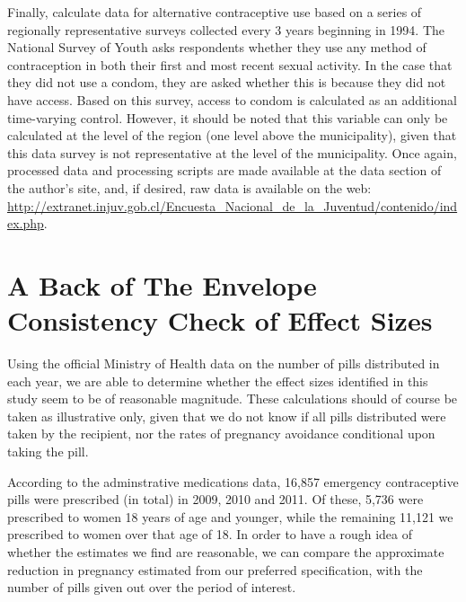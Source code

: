 Finally, \person calculate data for alternative contraceptive use based on
a series of regionally representative surveys collected every 3 years beginning
in 1994.  The National Survey of Youth asks respondents whether they use any 
method of contraception in both their first and most recent sexual activity.  
In the case that they did not use a condom, they are asked whether this is 
because they did not have access.  Based on this survey, access to condom is
calculated as an additional time-varying control.  However, it should be noted
that this variable can only be calculated at the level of the region (one 
level above the municipality), given that this data survey is not 
representative at the level of the municipality.  Once again, processed data
and processing scripts are made available at the data section of the author's
site, and, if desired, raw data is available on the web: 
\url{http://extranet.injuv.gob.cl/Encuesta_Nacional_de_la_Juventud/contenido/index.php}.

\section{A Back of The Envelope Consistency Check of Effect Sizes}
\label{TEENscn:BOE}
Using the official Ministry of Health data on the number of pills distributed
in each year, we are able to determine whether the effect sizes identified in
this study seem to be of reasonable magnitude.  These calculations should of
course be taken as illustrative only, given that we do not know if all pills
distributed were taken by the recipient, nor the rates of pregnancy avoidance
conditional upon taking the pill.

According to the adminstrative medications data, 16,857 emergency 
contraceptive pills were prescribed (in total) in 2009, 2010 and 2011. Of 
these, 5,736 were prescribed to women 18 years of age and younger, while the
remaining 11,121 we prescribed to women over that age of 18.  In order to have
a rough idea of whether the estimates we find are reasonable, we can compare
the approximate reduction in pregnancy estimated from our preferred 
specification, with the number of pills given out over the period of interest.

